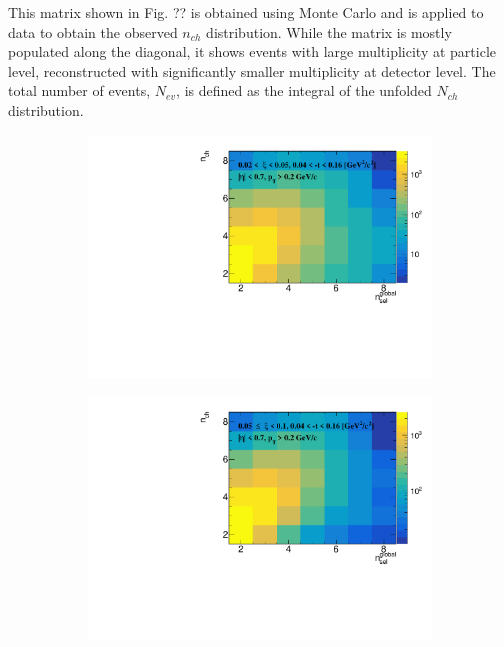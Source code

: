 This matrix shown in Fig. ?? is obtained using Monte Carlo and is applied to data to obtain the observed $n_{ch}$ distribution. While the matrix is mostly populated along the diagonal, it shows events with large multiplicity at particle
level, reconstructed with significantly smaller multiplicity at detector level. The total number of events, $N_{ev}$, is defined as the integral of the unfolded $N_{ch}$ distribution.
\captionsetup{format=plain,indention=0pt,justification=justified}
\begin{figure}[h!]
	\centering
	\begin{subfigure}{.49\textwidth}
		\includegraphics[width=\textwidth,page=1]{chapters/chrgSTAR/img/unfolding/matrix_0.pdf}
	\end{subfigure}
	\begin{subfigure}{.49\textwidth}
		\includegraphics[width=\textwidth,page=1]{chapters/chrgSTAR/img/unfolding/matrix_1.pdf}

\end{subfigure}
\end{figure}

